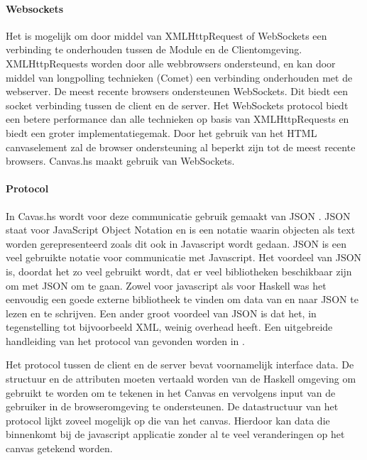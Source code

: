 \paragraph{Websockets}
Het is mogelijk om door middel van XMLHttpRequest of WebSockets een verbinding te onderhouden tussen de Module en de Clientomgeving. XMLHttpRequests worden door alle webbrowsers ondersteund, en kan door middel van longpolling technieken (Comet)  een verbinding onderhouden met de webserver. De meest recente browsers ondersteunen WebSockets. Dit biedt een socket verbinding tussen de client en de server. Het WebSockets protocol biedt een betere performance dan alle technieken op basis van XMLHttpRequests en biedt een groter implementatiegemak. Door het gebruik van het HTML canvaselement zal de browser ondersteuning al beperkt zijn tot de meest recente browsers. Canvas.hs maakt gebruik van WebSockets.

\paragraph{Protocol}
In Cavas.hs wordt voor deze communicatie gebruik gemaakt van JSON \cite{JSON2006}. JSON staat voor JavaScript Object Notation en is een notatie waarin objecten als text worden gerepresenteerd zoals dit ook in Javascript wordt gedaan. JSON is een veel gebruikte notatie voor communicatie met Javascript. Het voordeel van JSON is, doordat het zo veel gebruikt wordt, dat er veel bibliotheken beschikbaar zijn om met JSON om te gaan. Zowel voor javascript als voor Haskell was het eenvoudig een goede externe bibliotheek te vinden om data van en naar JSON te lezen en te schrijven. Een ander groot voordeel van JSON is dat het, in tegenstelling tot bijvoorbeeld XML, weinig overhead heeft. Een uitgebreide handleiding van het protocol van gevonden worden in \cite{Protocol2013}.

Het protocol tussen de client en de server bevat voornamelijk interface data. De structuur en de attributen moeten vertaald worden van de Haskell omgeving om gebruikt te worden om te tekenen in het Canvas en vervolgens input van de gebruiker in de browseromgeving te ondersteunen. De datastructuur van het protocol lijkt zoveel mogelijk op die van het canvas. Hierdoor kan data die binnenkomt bij de javascript applicatie zonder al te veel veranderingen op het canvas getekend worden.

